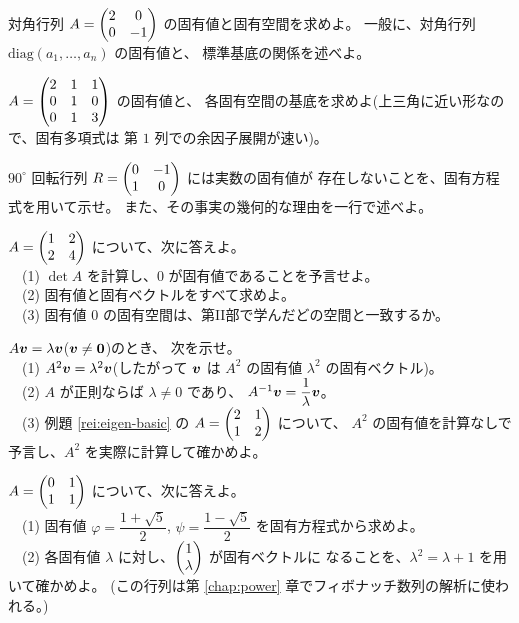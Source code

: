 \begin{mondai}[基本]\label{q:eigen-ex4}
対角行列 $A = \begin{pmatrix}2 & 0 \\ 0 & -1\end{pmatrix}$ の固有値と固有空間を求めよ。
一般に、対角行列 $\mathrm{diag}(a_1, \dots, a_n)$ の固有値と、
標準基底の関係を述べよ。
\end{mondai}

\begin{mondai}[標準]\label{q:eigen-ex5}
$A = \begin{pmatrix}2 & 1 & 1 \\ 0 & 1 & 0 \\ 0 & 1 & 3\end{pmatrix}$ の固有値と、
各固有空間の基底を求めよ(上三角に近い形なので、固有多項式は
第 $1$ 列での余因子展開が速い)。
\end{mondai}

\begin{mondai}[標準]\label{q:eigen-ex6}
$90^\circ$ 回転行列 $R = \begin{pmatrix}0 & -1 \\ 1 & 0\end{pmatrix}$ には実数の固有値が
存在しないことを、固有方程式を用いて示せ。
また、その事実の幾何的な理由を一行で述べよ。
\end{mondai}

\begin{mondai}[標準]\label{q:eigen-ex7}
$A = \begin{pmatrix}1 & 2 \\ 2 & 4\end{pmatrix}$ について、次に答えよ。\\
　(1) $\det A$ を計算し、$0$ が固有値であることを予言せよ。\\
　(2) 固有値と固有ベクトルをすべて求めよ。\\
　(3) 固有値 $0$ の固有空間は、第II部で学んだどの空間と一致するか。
\end{mondai}

\begin{mondai}[標準]\label{q:eigen-ex8}
$A\bm{v} = \lambda\bm{v}$($\bm{v} \neq \bm{0}$)のとき、
次を示せ。\\
　(1) $A^2\bm{v} = \lambda^2\bm{v}$(したがって $\bm{v}$ は
$A^2$ の固有値 $\lambda^2$ の固有ベクトル)。\\
　(2) $A$ が正則ならば $\lambda \neq 0$ であり、
$A^{-1}\bm{v} = \dfrac{1}{\lambda}\bm{v}$。\\
　(3) 例題 \ref{rei:eigen-basic} の $A = \begin{pmatrix}2 & 1 \\ 1 & 2\end{pmatrix}$ について、
$A^2$ の固有値を計算なしで予言し、$A^2$ を実際に計算して確かめよ。
\end{mondai}

\begin{mondai}[発展]\label{q:eigen-ex9}
$A = \begin{pmatrix}0 & 1 \\ 1 & 1\end{pmatrix}$ について、次に答えよ。\\
　(1) 固有値 $\varphi = \dfrac{1 + \sqrt{5}}{2}$,
$\psi = \dfrac{1 - \sqrt{5}}{2}$ を固有方程式から求めよ。\\
　(2) 各固有値 $\lambda$ に対し、$\begin{pmatrix}1 \\ \lambda\end{pmatrix}$ が固有ベクトルに
なることを、$\lambda^2 = \lambda + 1$ を用いて確かめよ。
(この行列は第 \ref{chap:power} 章でフィボナッチ数列の解析に使われる。)
\end{mondai}

